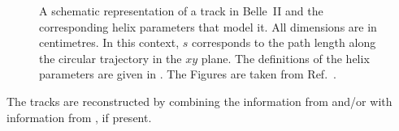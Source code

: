 \begin{figure}[hbtp!]
    \centering
    \caption{\label{fig:helix} A schematic representation of a track in Belle~II and the corresponding helix parameters that model it.
    All dimensions are in centimetres.
    In this context, $s$ corresponds to the path length along the circular trajectory in the $xy$ plane.
    The definitions of the helix parameters are given in .
    The Figures are taken from Ref.~\cite{BelleIITrackingGroup:2020hpx}.
    }
\end{figure}
The tracks are reconstructed by combining the information from \CDC and/or \SVD with information from \PXD, if present.

